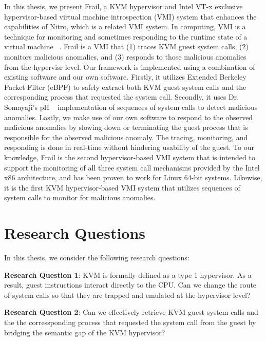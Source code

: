 \documentclass{report}
\begin{document}
\begin{spacing}{1.5}
{\large 
In this thesis, we present Frail, a KVM hypervisor and Intel VT-x exclusive hypervisor-based virtual machine introspection (VMI) system that enhances the capabilities of Nitro, which is a related VMI system. In computing, VMI is a technique for monitoring and sometimes responding to the runtime state of a virtual machine ~\cite{Payne2011}. Frail is a VMI that (1) traces KVM guest system calls, (2) monitors malicious anomalies, and (3) responds to those malicious anomalies from the hypervisr level. Our framework is implemented using a combination of existing software and our own software. Firstly, it utilizes Extended Berkeley Packet Filter (eBPF) to safely extract both KVM guest system calls and the corresponding process that requested the system call. Secondly, it uses Dr. Somayaji's pH ~\cite{somayaji2002operating} implementation of sequences of system calls to detect malicious anomalies. Lastly, we make use of our own software to respond to the observed malicious anomalies by slowing down or terminating the guest process that is responsible for the observed malicious anomaly. The tracing, monitoring, and responding is done in real-time without hindering usability of the guest. To our knowledge, Frail is the second hypervisor-based VMI system that is intended to support the monitoring of all three system call mechanisms provided by the Intel x86 architecture, and has been proven to work for Linux 64-bit systems. Likewise, it is the first KVM hypervisor-based VMI system that utilizes sequences of system calls to monitor for malicious anomalies. 
\newline
}







\section{Research Questions}

{\large
In this thesis, we consider the following research questions:
\newline
}

{\large
\textbf{Research Question 1}: KVM is formally defined as a type 1 hypervisor. As a result, guest instructions interact directly to the CPU. Can we change the route of system calls so that they are trapped and emulated at the hypervisor level?
\newline
}

{\large
\textbf{Research Question 2}: Can we effectively retrieve KVM guest system calls and the the corressponding process that requested the system call from the guest by bridging the semantic gap of the KVM hypervisor?
\newline
}



\end{spacing}
\end{document}
